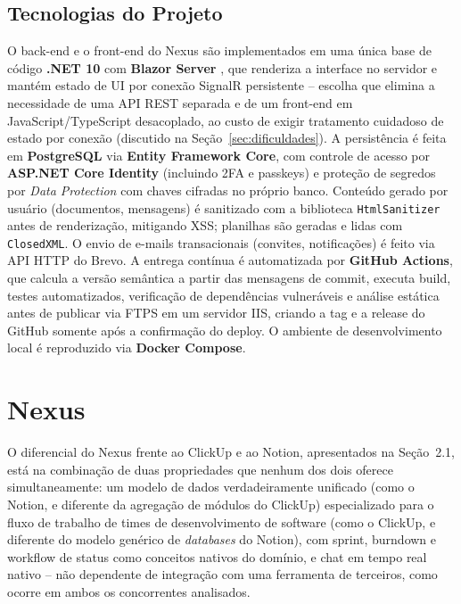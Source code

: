 \documentclass[12pt]{article}
\begin{document}
\subsection{Tecnologias do Projeto}

O back-end e o front-end do Nexus são implementados em uma única base de código \textbf{.NET 10} com \textbf{Blazor Server} \cite{blazor}, que renderiza a interface no servidor e mantém estado de UI por conexão SignalR persistente -- escolha que elimina a necessidade de uma API REST separada e de um front-end em JavaScript/TypeScript desacoplado, ao custo de exigir tratamento cuidadoso de estado por conexão (discutido na Seção~\ref{sec:dificuldades}). A persistência é feita em \textbf{PostgreSQL} \cite{postgresql} via \textbf{Entity Framework Core}, com controle de acesso por \textbf{ASP.NET Core Identity} (incluindo 2FA e passkeys) e proteção de segredos por \emph{Data Protection} com chaves cifradas no próprio banco. Conteúdo gerado por usuário (documentos, mensagens) é sanitizado com a biblioteca \texttt{HtmlSanitizer} antes de renderização, mitigando XSS; planilhas são geradas e lidas com \texttt{ClosedXML}. O envio de e-mails transacionais (convites, notificações) é feito via API HTTP do Brevo. A entrega contínua é automatizada por \textbf{GitHub Actions}, que calcula a versão semântica a partir das mensagens de commit, executa build, testes automatizados, verificação de dependências vulneráveis e análise estática antes de publicar via FTPS em um servidor IIS, criando a tag e a release do GitHub somente após a confirmação do deploy. O ambiente de desenvolvimento local é reproduzido via \textbf{Docker Compose}.

\section{Nexus}
\label{sec:nexus}

O diferencial do Nexus frente ao ClickUp e ao Notion, apresentados na Seção~2.1, está na combinação de duas propriedades que nenhum dos dois oferece simultaneamente: um modelo de dados verdadeiramente unificado (como o Notion, e diferente da agregação de módulos do ClickUp) especializado para o fluxo de trabalho de times de desenvolvimento de software (como o ClickUp, e diferente do modelo genérico de \emph{databases} do Notion), com sprint, burndown e workflow de status como conceitos nativos do domínio, e chat em tempo real nativo -- não dependente de integração com uma ferramenta de terceiros, como ocorre em ambos os concorrentes analisados.
\end{document}
